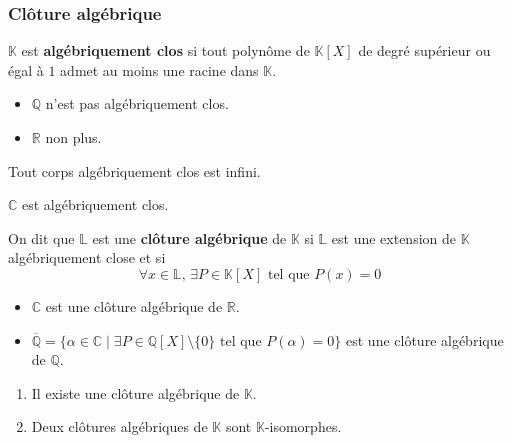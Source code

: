   \subsubsection{Clôture algébrique}

  \begin{definition}
    $\mathbb{K}$ est \textbf{algébriquement clos} si tout polynôme de $\mathbb{K}[X]$ de degré supérieur ou égal à $1$ admet au moins une racine dans $\mathbb{K}$.
  \end{definition}

  \begin{example}
    \begin{itemize}
      \item $\mathbb{Q}$ n'est pas algébriquement clos.
      \item $\mathbb{R}$ non plus.
    \end{itemize}
  \end{example}

  \begin{proposition}
    Tout corps algébriquement clos est infini.
  \end{proposition}

  \begin{theorem}
    $\mathbb{C}$ est algébriquement clos.
  \end{theorem}

  \begin{definition}
    On dit que $\mathbb{L}$ est une \textbf{clôture algébrique} de $\mathbb{K}$ si $\mathbb{L}$ est une extension de $\mathbb{K}$ algébriquement close et si
    \[ \forall x \in \mathbb{L}, \, \exists P \in \mathbb{K}[X] \text{ tel que } P(x) = 0 \]
  \end{definition}

  \begin{example}
    \begin{itemize}
      \item $\mathbb{C}$ est une clôture algébrique de $\mathbb{R}$.
      \item $\overline{\mathbb{Q}} = \{ \alpha \in \mathbb{C} \mid \exists P \in \mathbb{Q}[X] \setminus \{ 0 \} \text{ tel que } P(\alpha) = 0 \}$ est une clôture algébrique de $\mathbb{Q}$.
    \end{itemize}
  \end{example}

  \begin{theorem}[Steinitz]
    \begin{enumerate}[label=(\roman*)]
      \item Il existe une clôture algébrique de $\mathbb{K}$.
      \item Deux clôtures algébriques de $\mathbb{K}$ sont $\mathbb{K}$-isomorphes.
    \end{enumerate}
  \end{theorem}

